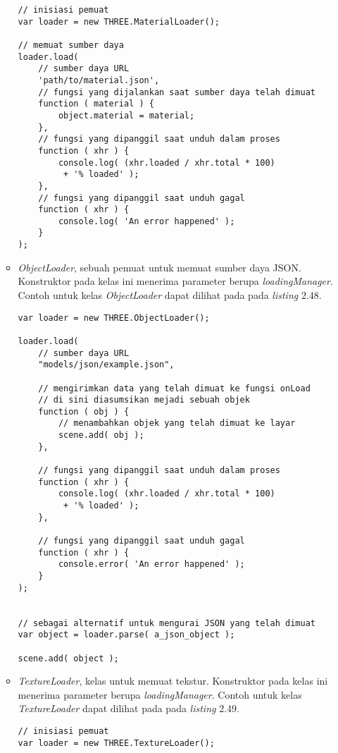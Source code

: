 \begin{itemize}
\begin{itemize}
\begin{lstlisting}[caption={Contoh penggunaan kelas {\it MaterialLoader}.},captionpos=b]
// inisiasi pemuat
var loader = new THREE.MaterialLoader();

// memuat sumber daya
loader.load(
	// sumber daya URL
	'path/to/material.json',
	// fungsi yang dijalankan saat sumber daya telah dimuat
	function ( material ) {
		object.material = material;
	},
	// fungsi yang dipanggil saat unduh dalam proses
	function ( xhr ) {
		console.log( (xhr.loaded / xhr.total * 100)
		 + '% loaded' );
	},
	// fungsi yang dipanggil saat unduh gagal
	function ( xhr ) {
		console.log( 'An error happened' );
	}
);
\end{lstlisting}

	\item {\it ObjectLoader}, sebuah pemuat untuk memuat sumber daya JSON. Konstruktor pada kelas ini menerima parameter berupa  {\it loadingManager}. Contoh untuk kelas {\it ObjectLoader} dapat dilihat pada pada {\it listing} 2.48.
	
\begin{lstlisting}[caption={Contoh penggunaan kelas {\it ObjectLoader}.},captionpos=b]
var loader = new THREE.ObjectLoader();

loader.load(
    // sumber daya URL
    "models/json/example.json",

    // mengirimkan data yang telah dimuat ke fungsi onLoad
    // di sini diasumsikan mejadi sebuah objek
    function ( obj ) {
		// menambahkan objek yang telah dimuat ke layar
        scene.add( obj );
    },

    // fungsi yang dipanggil saat unduh dalam proses
    function ( xhr ) {
        console.log( (xhr.loaded / xhr.total * 100)
         + '% loaded' );
    },

    // fungsi yang dipanggil saat unduh gagal
    function ( xhr ) {
        console.error( 'An error happened' );
    }
);


// sebagai alternatif untuk mengurai JSON yang telah dimuat
var object = loader.parse( a_json_object );

scene.add( object );
\end{lstlisting}

	\item {\it TextureLoader}, kelas untuk memuat tekstur. Konstruktor pada kelas ini menerima parameter berupa  {\it loadingManager}. Contoh untuk kelas {\it TextureLoader} dapat dilihat pada pada {\it listing} 2.49.
	
\begin{lstlisting}[caption={Contoh penggunaan kelas {\it TextureLoader}.},captionpos=b]
// inisiasi pemuat
var loader = new THREE.TextureLoader();


\end{lstlisting}
\end{itemize}
\end{itemize}
